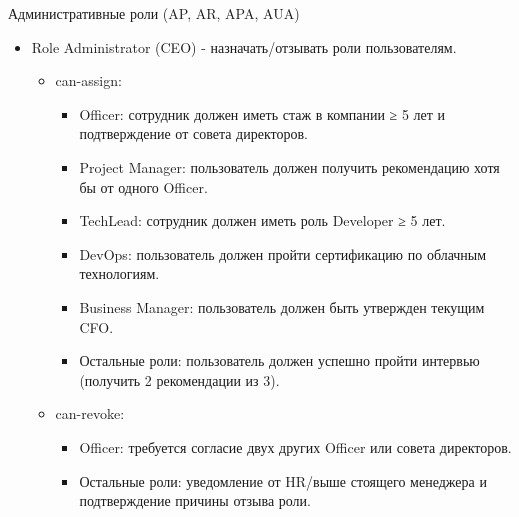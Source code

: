 \documentclass[10pt]{beamer}
\begin{document}
\begin{frame}{Административные роли (AP, AR, APA, AUA)}
    \begin{itemize}
        \item Role Administrator (CEO) - назначать/отзывать роли пользователям.
        \begin{itemize}
            \item can-assign:
            \begin{itemize}
                \item Officer: сотрудник должен иметь стаж в компании ≥ 5 лет и подтверждение от совета директоров.
                \item Project Manager: пользователь должен получить рекомендацию хотя бы от одного Officer.
                \item TechLead: сотрудник должен иметь роль Developer ≥ 5 лет.
                \item DevOps: пользователь должен пройти сертификацию по облачным технологиям.
                \item Business Manager: пользователь должен быть утвержден текущим CFO.
                \item Остальные роли: пользователь должен успешно пройти интервью (получить 2 рекомендации из 3).
            \end{itemize}
            \item can-revoke:
            \begin{itemize}
                \item Officer: требуется согласие двух других Officer или совета директоров.
                \item Остальные роли: уведомление от HR/выше стоящего менеджера и подтверждение причины отзыва роли.
            \end{itemize}
        \end{itemize}
    \end{itemize}
\end{frame}
\end{document}
